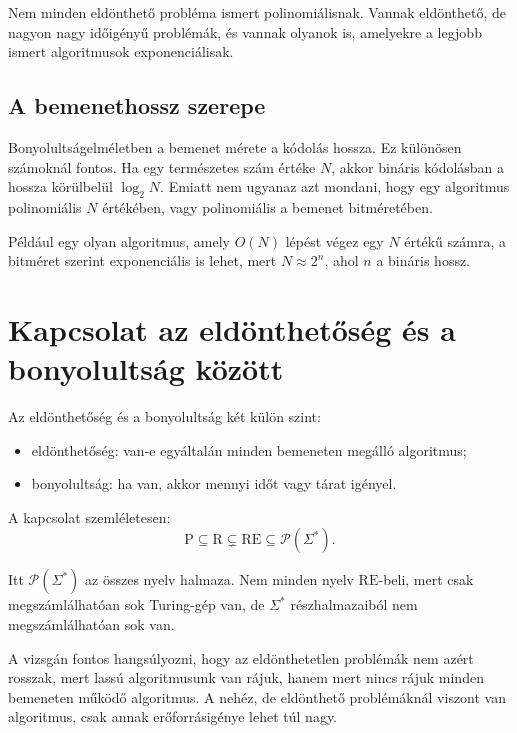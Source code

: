 Nem minden eldönthető probléma ismert polinomiálisnak. Vannak eldönthető, de nagyon nagy időigényű problémák, és vannak olyanok is, amelyekre a legjobb ismert algoritmusok exponenciálisak.

\subsection{A bemenethossz szerepe}

Bonyolultságelméletben a bemenet mérete a kódolás hossza. Ez különösen számoknál fontos. Ha egy természetes szám értéke $N$, akkor bináris kódolásban a hossza körülbelül $\log_2 N$. Emiatt nem ugyanaz azt mondani, hogy egy algoritmus polinomiális $N$ értékében, vagy polinomiális a bemenet bitméretében.

Például egy olyan algoritmus, amely $O(N)$ lépést végez egy $N$ értékű számra, a bitméret szerint exponenciális is lehet, mert $N\approx 2^n$, ahol $n$ a bináris hossz.


\section{Kapcsolat az eldönthetőség és a bonyolultság között}

Az eldönthetőség és a bonyolultság két külön szint:

\begin{itemize}
  \item eldönthetőség: van-e egyáltalán minden bemeneten megálló algoritmus;
  \item bonyolultság: ha van, akkor mennyi időt vagy tárat igényel.
\end{itemize}

A kapcsolat szemléletesen:
\[
  \mathrm{P}\subseteq\mathrm{R}\subsetneq\mathrm{RE}\subseteq\mathcal P(\Sigma^*).
\]

Itt $\mathcal P(\Sigma^*)$ az összes nyelv halmaza. Nem minden nyelv $\mathrm{RE}$-beli, mert csak megszámlálhatóan sok Turing-gép van, de $\Sigma^*$ részhalmazaiból nem megszámlálhatóan sok van.

A vizsgán fontos hangsúlyozni, hogy az eldönthetetlen problémák nem azért rosszak, mert lassú algoritmusunk van rájuk, hanem mert nincs rájuk minden bemeneten működő algoritmus. A nehéz, de eldönthető problémáknál viszont van algoritmus, csak annak erőforrásigénye lehet túl nagy.

